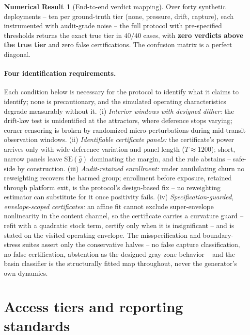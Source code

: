 \documentclass[11pt]{article}
\theoremstyle{definition}
\newtheorem{numresult}[condition]{Numerical Result}
\theoremstyle{remark}
\numberwithin{equation}{section}
\begin{document}
\begin{numresult}[End-to-end verdict mapping]\label{nr:endtoend}
Over forty synthetic deployments -- ten per ground-truth tier (none, pressure, drift, capture), each instrumented with audit-grade noise -- the full protocol with pre-specified thresholds returns the exact true tier in $40/40$ cases, with \textbf{zero verdicts above the true tier} and zero false certifications. The confusion matrix is a perfect diagonal.
\end{numresult}

\paragraph{Four identification requirements.} Each condition below is necessary for the protocol to identify what it claims to identify; none is precautionary, and the simulated operating characteristics degrade measurably without it. (i) \emph{Interior windows with designed dither:} the drift-law test is unidentified at the attractors, where deference stops varying; corner censoring is broken by randomized micro-perturbations during mid-transit observation windows. (ii) \emph{Identifiable certificate panels:} the certificate's power arrives only with wide deference variation and panel length ($T \approx 1200$); short, narrow panels leave $\mathrm{SE}(\hat g)$ dominating the margin, and the rule abstains -- safe-side by construction. (iii) \emph{Audit-retained enrollment:} under annihilating churn no reweighting recovers the harmed group; enrollment before exposure, retained through platform exit, is the protocol's design-based fix -- no reweighting estimator can substitute for it once positivity fails. (iv) \emph{Specification-guarded, envelope-scoped certificates:} an affine fit cannot exclude super-envelope nonlinearity in the content channel, so the certificate carries a curvature guard -- refit with a quadratic stock term, certify only when it is insignificant -- and is stated on the visited operating envelope. The misspecification and boundary-stress suites assert only the conservative halves -- no false capture classification, no false certification, abstention as the designed gray-zone behavior -- and the basin classifier is the structurally fitted map throughout, never the generator's own dynamics.

\section{Access tiers and reporting standards}\label{sec:access}
\end{document}
